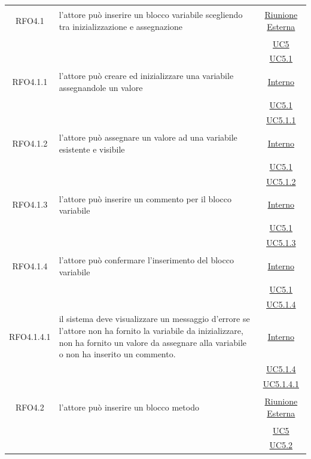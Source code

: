\begin{longtable}{|c|>{\centering}m{7cm}|c|}
\hypertarget{RFO4.1}{RFO4.1} & l'attore può inserire un blocco variabile scegliendo tra inizializzazione e assegnazione &  \hyperlink{Riunione Esterna}{Riunione Esterna}\\
& &\hyperref[UC5]{UC5}\\
& &\hyperref[UC5.1]{UC5.1}\\ \hline

\hypertarget{RFO4.1.1}{RFO4.1.1} & l'attore può creare ed inizializzare una variabile assegnandole un valore & \hyperlink{Interno}{Interno}\\
& &\hyperref[UC5.1]{UC5.1}\\
& &\hyperref[UC5.1.1]{UC5.1.1}\\ \hline

\hypertarget{RFO4.1.2}{RFO4.1.2} & l'attore può assegnare un valore ad una variabile esistente e visibile & \hyperlink{Interno}{Interno}\\
& &\hyperref[UC5.1]{UC5.1}\\
& &\hyperref[UC5.1.2]{UC5.1.2}\\ \hline

\hypertarget{RFO4.1.3}{RFO4.1.3} & l'attore può inserire un commento per il blocco variabile & \hyperlink{Interno}{Interno}\\
& &\hyperref[UC5.1]{UC5.1}\\
& &\hyperref[UC5.1.3]{UC5.1.3}\\ \hline

\hypertarget{RFO4.1.4}{RFO4.1.4} & l'attore può confermare l'inserimento del blocco variabile &\hyperlink{Interno}{Interno}\\
& &\hyperref[UC5.1]{UC5.1}\\
& &\hyperref[UC5.1.4]{UC5.1.4}\\ \hline

\hypertarget{RFO4.1.4.1}{RFO4.1.4.1} & il sistema deve visualizzare un messaggio d'errore se l'attore non ha fornito la variabile da inizializzare, non ha fornito un valore da assegnare alla variabile o non ha inserito un commento. & \hyperlink{Interno}{Interno}\\
& &\hyperref[UC5.1.4]{UC5.1.4}\\
& &\hyperref[UC5.1.4.1]{UC5.1.4.1}\\ \hline

\hypertarget{RFO4.2}{RFO4.2} & l'attore può inserire un blocco metodo & \hyperlink{Riunione Esterna}{Riunione Esterna}\\
& &\hyperref[UC5]{UC5}\\
& &\hyperref[UC5.2]{UC5.2}\\ \hline


\end{longtable}
